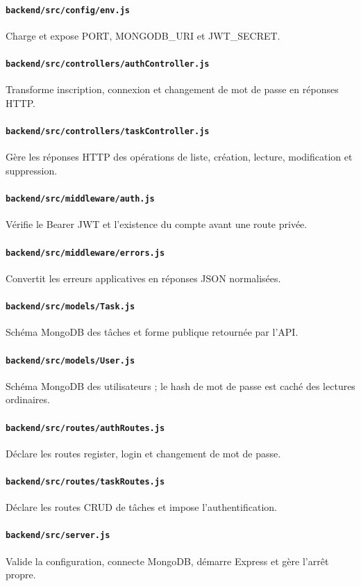 \documentclass[10pt,a4paper]{article}
\begin{document}
\paragraph{\texttt{backend/src/config/env.js}} Charge et expose PORT, MONGODB\_URI et JWT\_SECRET.
\paragraph{\texttt{backend/src/controllers/authController.js}} Transforme inscription, connexion et changement de mot de passe en réponses HTTP.
\paragraph{\texttt{backend/src/controllers/taskController.js}} Gère les réponses HTTP des opérations de liste, création, lecture, modification et suppression.
\paragraph{\texttt{backend/src/middleware/auth.js}} Vérifie le Bearer JWT et l'existence du compte avant une route privée.
\paragraph{\texttt{backend/src/middleware/errors.js}} Convertit les erreurs applicatives en réponses JSON normalisées.
\paragraph{\texttt{backend/src/models/Task.js}} Schéma MongoDB des tâches et forme publique retournée par l'API.
\paragraph{\texttt{backend/src/models/User.js}} Schéma MongoDB des utilisateurs ; le hash de mot de passe est caché des lectures ordinaires.
\paragraph{\texttt{backend/src/routes/authRoutes.js}} Déclare les routes register, login et changement de mot de passe.
\paragraph{\texttt{backend/src/routes/taskRoutes.js}} Déclare les routes CRUD de tâches et impose l'authentification.
\paragraph{\texttt{backend/src/server.js}} Valide la configuration, connecte MongoDB, démarre Express et gère l'arrêt propre.
\end{document}

